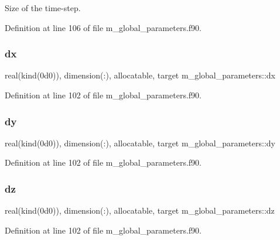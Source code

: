 Size of the time-\/step. 



Definition at line 106 of file m\+\_\+global\+\_\+parameters.\+f90.

\mbox{\label{namespacem__global__parameters_af7508eba0a53c9a35913a502d58dfb54}} 
\subsubsection{\texorpdfstring{dx}{dx}}
{\footnotesize\ttfamily real(kind(0d0)), dimension(\+:), allocatable, target m\+\_\+global\+\_\+parameters\+::dx}



Definition at line 102 of file m\+\_\+global\+\_\+parameters.\+f90.

\mbox{\label{namespacem__global__parameters_adc2bc27e809a773b7f5a6a65edac3b89}} 
\subsubsection{\texorpdfstring{dy}{dy}}
{\footnotesize\ttfamily real(kind(0d0)), dimension(\+:), allocatable, target m\+\_\+global\+\_\+parameters\+::dy}



Definition at line 102 of file m\+\_\+global\+\_\+parameters.\+f90.

\mbox{\label{namespacem__global__parameters_a04878814b8097100a179152ba853262a}} 
\subsubsection{\texorpdfstring{dz}{dz}}
{\footnotesize\ttfamily real(kind(0d0)), dimension(\+:), allocatable, target m\+\_\+global\+\_\+parameters\+::dz}



Definition at line 102 of file m\+\_\+global\+\_\+parameters.\+f90.

